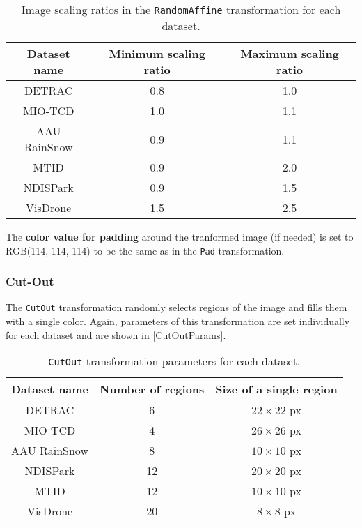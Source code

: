 \begin{table}[h]
\centering
\begin{tabular}{|c|c|c|}
    \hline
    Dataset name & Minimum scaling ratio & Maximum scaling ratio \\
    \hline
    DETRAC       & 0.8 & 1.0 \\
    MIO-TCD      & 1.0 & 1.1 \\
    AAU RainSnow & 0.9 & 1.1 \\
    MTID         & 0.9 & 2.0 \\
    NDISPark     & 0.9 & 1.5 \\
    VisDrone     & 1.5 & 2.5 \\
    \hline
\end{tabular}
\caption{Image scaling ratios in the \texttt{RandomAffine} transformation for each dataset.}
\label{RandomAffineScalingRatios}
\end{table}

The \textbf{color value for padding} around the tranformed image (if needed)
is set to RGB(114, 114, 114) to be the same as in the \texttt{Pad} transformation.

\subsubsection*{Cut-Out}

The \texttt{CutOut} transformation randomly selects regions of the image and
fills them with a single color. Again, parameters of this transformation are set
individually for each dataset and are shown in \autoref{CutOutParams}.

\begin{table}[h]
\centering
\begin{tabular}{|c|c|c|}
    \hline
    Dataset name & Number of regions & Size of a single region \\
    \hline
    DETRAC       &  6 & $22 \times 22$ px \\
    MIO-TCD      &  4 & $26 \times 26$ px \\
    AAU RainSnow &  8 & $10 \times 10$ px \\
    NDISPark     & 12 & $20 \times 20$ px \\
    MTID         & 12 & $10 \times 10$ px \\
    VisDrone     & 20 & $8 \times 8$ px \\
    \hline
\end{tabular}
\caption{\texttt{CutOut} transformation parameters for each dataset.}
\label{CutOutParams}
\end{table}

